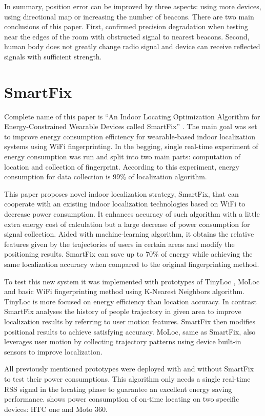 In summary, position error can be improved by three aspects: using more devices, using directional map or increasing the number of beacons. There are two main conclusions of this paper. First, confirmed precision degradation when testing near the edges of the room with obstructed signal to nearest beacons. Second, human body does not greatly change radio signal and device can receive reflected signals with sufficient strength. 

\section{SmartFix}\label{sec:SmartFix}
Complete name of this paper is \enquote{An Indoor Locating Optimization Algorithm for Energy-Constrained Wearable Devices called SmartFix} \cite{SmartFix}. The main goal was set to improve energy consumption efficiency for wearable-based indoor localization systems using WiFi fingerprinting. In the begging, single real-time experiment of energy consumption was run and split into two main parts: computation of location and collection of fingerprint. According to this experiment, energy consumption for data collection is 99\% of localization algorithm.

This paper proposes novel indoor localization strategy, SmartFix, that can cooperate with an existing indoor localization technologies based on WiFi to decrease power consumption. It enhances accuracy of such algorithm with a little extra energy cost of calculation but a large decrease of power consumption for signal collection. Aided with machine-learning algorithm, it obtains the relative features given by the trajectories of users in certain areas and modify the positioning results. SmartFix can save up to 70\% of energy while achieving the same localization accuracy when compared to the original fingerprinting method.

To test this new system it was implemented with prototypes of TinyLoc \cite{TinyLoc}, MoLoc \cite{MoLoc} and basic WiFi fingerprinting method using K-Nearest Neighbors algorithm. TinyLoc is more focused on energy efficiency than location accuracy. In contrast SmartFix analyses the history of people trajectory in given area to improve localization results by referring to user motion features. SmartFix then modifies positional results to achieve satisfying accuracy. MoLoc, same as SmartFix, also leverages user motion by collecting trajectory patterns using device built-in sensors to improve localization.

All previously mentioned prototypes were deployed with and without SmartFix to test their power consumptions. This algorithm only needs a single real-time RSS signal in the locating phase to guarantee an excellent energy saving performance.  shows power consumption of on-time locating on two specific devices: HTC one and Moto 360. 

